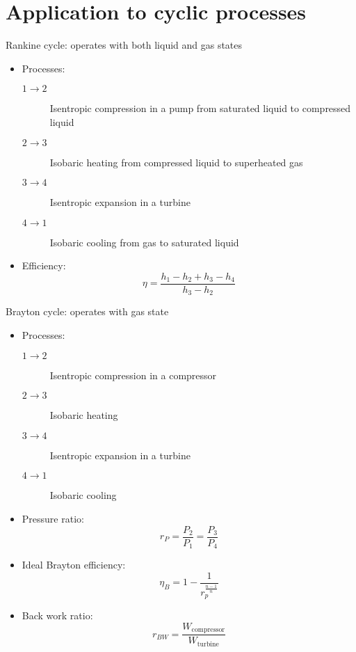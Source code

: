 \documentclass[10pt, twocolumn]{article}
\begin{document}
\section{Application to cyclic processes}
Rankine cycle: operates with both liquid and gas states
\begin{itemize}
  \item Processes:
        \begin{description}
          \item[\(1 \rightarrow 2\)] Isentropic compression in a pump from saturated liquid to compressed liquid
          \item[\(2 \rightarrow 3\)] Isobaric heating from compressed liquid to superheated gas
          \item[\(3 \rightarrow 4\)] Isentropic expansion in a turbine
          \item[\(4 \rightarrow 1\)] Isobaric cooling from gas to saturated liquid
        \end{description}
  \item Efficiency:
        \[
          \eta = \frac{h_1 - h_2 + h_3 - h_4 }{h_3 - h_2 }
        \]
\end{itemize}

Brayton cycle: operates with gas state
\begin{itemize}
  \item Processes:
        \begin{description}
          \item[\(1 \rightarrow 2\)] Isentropic compression in a compressor
          \item[\(2 \rightarrow 3\)] Isobaric heating
          \item[\(3 \rightarrow 4\)] Isentropic expansion in a turbine
          \item[\(4 \rightarrow 1\)] Isobaric cooling
        \end{description}
  \item Pressure ratio:
        \[
          r_P = \frac{P_2 }{P_1 } = \frac{P_3 }{P_4 }
        \]
  \item Ideal Brayton efficiency:
        \[
          \eta_B = 1 - \frac{1}{r_p ^{\frac{n - 1}{n}}}
        \]
  \item Back work ratio:
        \[
          r_{BW} = \frac{W_{\mathrm{compressor}}}{W_{\mathrm{turbine}}}
        \]
\end{itemize}
\end{document}

